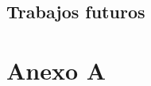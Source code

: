 \documentclass[11pt,english,listoffigures,listoftables]{tfgetsinf}
\begin{document}
\section{Trabajos futuros}




%


\cleardoublepage


\APPENDIX
\chapter{Anexo A}\label{Anexo A}

\end{document}
